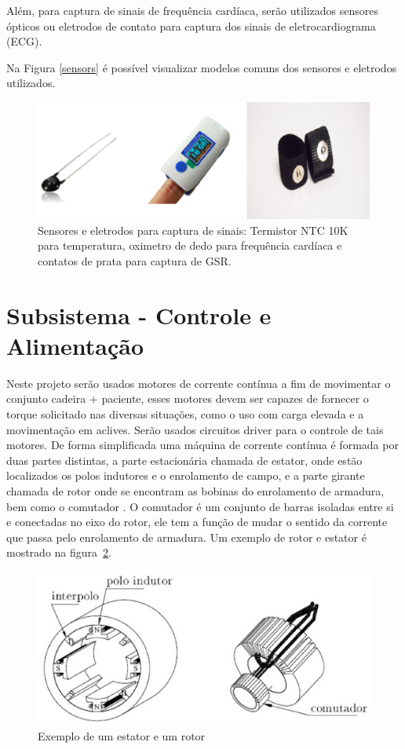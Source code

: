 Além, para captura de sinais de frequência cardíaca, serão utilizados sensores ópticos ou eletrodos de contato para captura dos sinais de eletrocardiograma (ECG).

Na Figura \ref{sensors} é possível visualizar modelos comuns dos sensores e eletrodos utilizados.

\begin{figure}[H]
  \centering
    \includegraphics[width=\textwidth]{figuras/sensors.eps}
  \caption{Sensores e eletrodos para captura de sinais: Termistor NTC 10K para temperatura, oximetro de dedo para frequência cardíaca e contatos de prata para captura de GSR.}
  \label{fig:sensors}
\end{figure}

\section{Subsistema - Controle e Alimentação}
Neste projeto serão usados motores de corrente contínua a fim de movimentar o conjunto
cadeira $+$ paciente, esses motores devem ser capazes de fornecer o torque solicitado
nas diversas situações, como o uso com carga elevada e a movimentação em aclives.
Serão usados circuitos driver para o controle de tais motores. De forma simplificada
uma máquina de corrente contínua é formada por duas partes distintas, a parte
estacionária chamada de estator, onde estão localizados os polos indutores e o
enrolamento de campo, e a parte girante chamada de rotor onde se encontram as
bobinas do enrolamento de armadura, bem como o comutador  \cite{bim}. O comutador
é um conjunto de barras isoladas entre si e conectadas no eixo do rotor, ele tem
a função de mudar o sentido da corrente que passa pelo enrolamento de armadura.
Um exemplo de rotor e estator é mostrado na figura~\ref{fig:rotor}.

\begin{figure}[H]
  \centering
    \includegraphics[width=\textwidth]{figuras/rotor.eps}
  \caption{Exemplo de um estator e um rotor \cite{bim}}
  \label{fig:rotor}
\end{figure}

